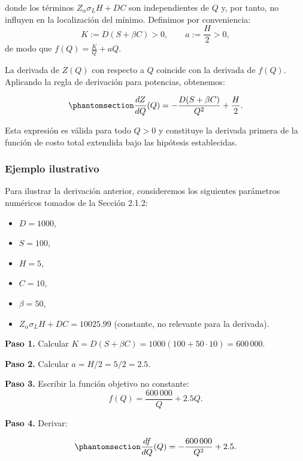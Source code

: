 \documentclass[
  spanish,
  us-letterpaper,
  DIV=11,
  numbers=noendperiod]{scrreprt}
\providecommand{\tightlist}{%
  \setlength{\itemsep}{0pt}\setlength{\parskip}{0pt}}
\numberwithin{equation}{section}
\begin{document}
donde los términos \(Z_\alpha \sigma_L H + D C\) son independientes de
\(Q\) y, por tanto, no influyen en la localización del mínimo. Definimos
por conveniencia: \[
K := D(S + \beta C) > 0, \qquad a := \frac{H}{2} > 0,
\] de modo que \(f(Q) = \frac{K}{Q} + a Q\).

La derivada de \(Z(Q)\) con respecto a \(Q\) coincide con la derivada de
\(f(Q)\). Aplicando la regla de derivación para potencias, obtenemos:

\begin{equation}\phantomsection\label{eq-dZ_dQ}{
\frac{dZ}{dQ}(Q) = -\frac{D(S + \beta C)}{Q^2} + \frac{H}{2}.
}\end{equation}

Esta expresión es válida para todo \(Q > 0\) y constituye la derivada
primera de la función de costo total extendida bajo las hipótesis
establecidas.

\subsubsection{Ejemplo ilustrativo}\label{ejemplo-ilustrativo-4}

Para ilustrar la derivación anterior, consideremos los siguientes
parámetros numéricos tomados de la Sección 2.1.2:

\begin{itemize}
\tightlist
\item
  \(D = 1000\),
\item
  \(S = 100\),
\item
  \(H = 5\),
\item
  \(C = 10\),
\item
  \(\beta = 50\),
\item
  \(Z_\alpha \sigma_L H + D C = 10025.99\) (constante, no relevante para
  la derivada).
\end{itemize}

\textbf{Paso 1.} Calcular
\(K = D(S + \beta C) = 1000(100 + 50 \cdot 10) = 600\,000\).

\textbf{Paso 2.} Calcular \(a = H/2 = 5/2 = 2.5\).

\textbf{Paso 3.} Escribir la función objetivo no constante: \[
f(Q) = \frac{600\,000}{Q} + 2.5 Q.
\]

\textbf{Paso 4.} Derivar:

\begin{equation}\phantomsection\label{eq-df_dQ_ejemplo}{
\frac{df}{dQ}(Q) = -\frac{600\,000}{Q^2} + 2.5.
}\end{equation}
\end{document}
